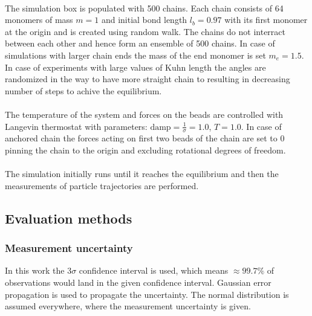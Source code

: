 \documentclass[
    paper=A4,pagesize=automedia,fontsize=12pt,
    BCOR=15mm,DIV=22,
    twoside,headinclude,footinclude=false,
    fleqn,             %
    bibliography=totocnumbered,          %
    listof=totoc,                %
    listof=flat,                 %
    cleardoublepage=empty      %
    numbers=endperiod
]{scrartcl}
\begin{document}
\\
The simulation box is populated with 500 chains. Each chain consists of 64 monomers of mass $m=1$
and initial bond length $l_b=0.97$ with its first monomer at the origin
and is created using random walk. 
The chains do not interract between each other and hence form
an ensemble of 500 chains. In case of simulations with larger chain ends 
the mass of the end monomer
is set $m_e=1.5$. In case of experiments with large values of Kuhn length the 
angles are randomized in 
the way to have more straight chain to resulting in decreasing number of 
steps to achive the equilibrium.
\\
\\
The temperature of the system and forces on the beads are controlled with
Langevin thermostat with parameters: $\text{damp}=\frac{1}{\sigma}=1.0$, $T=1.0$. In case of anchored
chain the forces acting on first two beads of the chain are set to 0 pinning the chain to the origin
and excluding rotational degrees of freedom.
\\
\\
The simulation initially runs until it reaches the equilibrium and then the measurements
of particle trajectories are performed. 

\subsection{Evaluation methods}

\subsubsection{Measurement uncertainty}
In this work the 3$\sigma$ confidence interval is used, which means
$\approx99.7 \%$ of observations would land in the given confidence interval.
Gaussian error propagation is used to propagate the uncertainty. The normal
distribution is assumed everywhere, where the measurement uncertainty is given.
\end{document}
